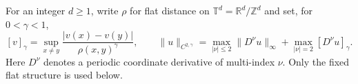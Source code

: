 For an integer $d\geq1$, write $\rho$ for flat distance on
$\mathbb T^d=\mathbb R^d/\mathbb Z^d$ and set, for $0<\gamma<1$,
\[
 [v]_\gamma=\sup_{x\ne y}\frac{|v(x)-v(y)|}{\rho(x,y)^\gamma},\qquad
 \|u\|_{C^{2,\gamma}}
 =\max_{|\nu|\leq2}\|D^\nu u\|_\infty
   +\max_{|\nu|=2}[D^\nu u]_\gamma.
\]
Here $D^\nu$ denotes a periodic coordinate derivative of multi-index $\nu$.
Only the fixed flat structure is used below.